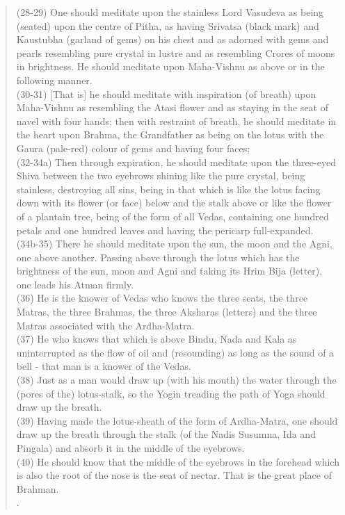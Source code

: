 \documentclass[a4paper,12pt]{article}
\begin{document}
\begin{quote}
(28-29) One should meditate upon the stainless Lord Vasudeva as being (seated) upon the centre of Pitha, as having Srivatsa (black mark) and Kaustubha (garland of gems) on his chest and as adorned with gems and pearls resembling pure crystal in lustre and as resembling Crores of moons in brightness. He should meditate upon Maha-Vishnu as above or in the following manner.\\
(30-31) [That is] he should meditate with inspiration (of breath) upon Maha-Vishnu as resembling the Atasi flower and as staying in the seat of navel with four hands; then with restraint of breath, he should meditate in the heart upon Brahma, the Grandfather as being on the lotus with the Gaura (pale-red) colour of gems and having four faces;\\
(32-34a) Then through expiration, he should meditate upon the three-eyed Shiva between the two eyebrows shining like the pure crystal, being stainless, destroying all sins, being in that which is like the lotus facing down with its flower (or face) below and the stalk above or like the flower of a plantain tree, being of the form of all Vedas, containing one hundred petals and one hundred leaves and having the pericarp full-expanded.\\
(34b-35) There he should meditate upon the sun, the moon and the Agni, one above another. Passing above through the lotus which has the brightness of the sun, moon and Agni and taking its Hrim Bija (letter), one leads his Atman firmly.\\
(36) He is the knower of Vedas who knows the three seats, the three Matras, the three Brahmas, the three Aksharas (letters) and the three Matras associated with the Ardha-Matra.\\
(37) He who knows that which is above Bindu, Nada and Kala as uninterrupted as the flow of oil and (resounding) as long as the sound of a bell - that man is a knower of the Vedas.\\
(38) Just as a man would draw up (with his mouth) the water through the (pores of the) lotus-stalk, so the Yogin treading the path of Yoga should draw up the breath.\\
(39) Having made the lotus-sheath of the form of Ardha-Matra, one should draw up the breath through the stalk (of the Nadis Susumna, Ida and Pingala) and absorb it in the middle of the eyebrows.\\
(40) He should know that the middle of the eyebrows in the forehead which is also the root of the nose is the seat of nectar. That is the great place of Brahman.\\
\parencite{dbhutrans}. 

\end{quote}
\end{document}
